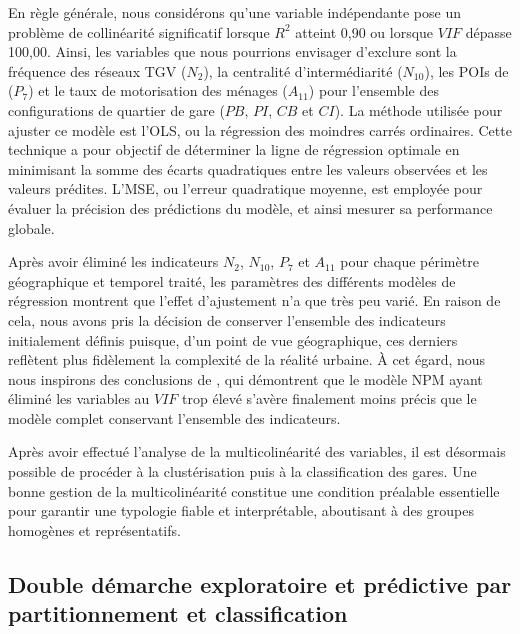 \begin{refsegment}
En règle générale, nous considérons qu’une variable indépendante pose un problème de collinéarité significatif lorsque \(R^{2}\) atteint 0,90 ou lorsque \(VIF\) dépasse 100,00. Ainsi, les variables que nous pourrions envisager d'exclure sont la fréquence des réseaux \acrshort{TGV} (\(N_{2}\)), la centralité d'intermédiarité (\(N_{10}\)), les \acrshort{POIs} de  (\(P_{7}\)) et le taux de motorisation des ménages (\(A_{11}\)) pour l'ensemble des configurations de quartier de gare (\(PB\), \(PI\), \(CB\) et \(CI\)). La méthode utilisée pour ajuster ce modèle est l'\acrfull{OLS}, ou la régression des moindres carrés ordinaires. Cette technique a pour objectif de déterminer la ligne de régression optimale en minimisant la somme des écarts quadratiques entre les valeurs observées et les valeurs prédites. L'\acrfull{MSE}, ou l'erreur quadratique moyenne, est employée pour évaluer la précision des prédictions du modèle, et ainsi mesurer sa performance globale.%

Après avoir éliminé les indicateurs \(N_{2}\), \(N_{10}\), \(P_{7}\) et \(A_{11}\) pour chaque périmètre géographique et temporel traité, les paramètres des différents modèles de régression montrent que l'effet d'ajustement n'a que très peu varié. En raison de cela, nous avons pris la décision de conserver l'ensemble des indicateurs initialement définis puisque, d'un point de vue géographique, ces derniers reflètent plus fidèlement la complexité de la réalité urbaine. À cet égard, nous nous inspirons des conclusions de \textcolor{blue}{\textcite[16]{cao_coordination_2020}}, qui démontrent que le modèle \acrshort{NPM} ayant éliminé les variables au \(VIF\) trop élevé s'avère finalement moins précis que le modèle complet conservant l'ensemble des indicateurs.%

Après avoir effectué l'analyse de la multicolinéarité des variables, il est désormais possible de procéder à la clustérisation puis à la classification des gares. Une bonne gestion de la multicolinéarité constitue une condition préalable essentielle pour garantir une typologie fiable et interprétable, aboutisant à des groupes homogènes et représentatifs.%

\subsection{Double démarche exploratoire et prédictive par partitionnement et classification
    \label{chap6:methodologie-statistiques-clusterisation-classification}
    }


\end{refsegment}

